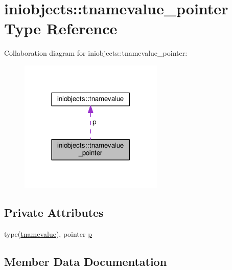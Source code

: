 \hypertarget{structiniobjects_1_1tnamevalue__pointer}{}\section{iniobjects\+:\+:tnamevalue\+\_\+pointer Type Reference}
\label{structiniobjects_1_1tnamevalue__pointer}


Collaboration diagram for iniobjects\+:\+:tnamevalue\+\_\+pointer\+:
\nopagebreak
\begin{figure}[H]
\begin{center}
\leavevmode
\includegraphics[width=194pt]{structiniobjects_1_1tnamevalue__pointer__coll__graph}
\end{center}
\end{figure}
\subsection*{Private Attributes}
\begin{DoxyCompactItemize}
\item 
type(\mbox{\hyperlink{structiniobjects_1_1tnamevalue}{tnamevalue}}), pointer \mbox{\hyperlink{structiniobjects_1_1tnamevalue__pointer_a7039ab863bf0402bcbedf14b20ee35ec}{p}}
\end{DoxyCompactItemize}


\subsection{Member Data Documentation}
\mbox{\label{structiniobjects_1_1tnamevalue__pointer_a7039ab863bf0402bcbedf14b20ee35ec}} 
